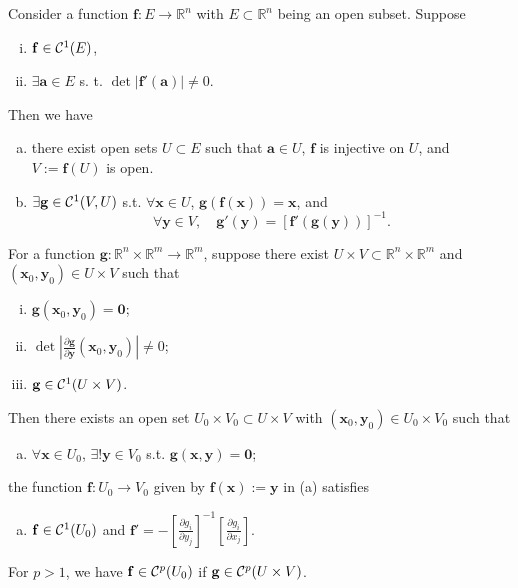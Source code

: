 \begin{thm}
  \label{thm:inverseFunc}
  Consider a function $\mathbf{f}: E\rightarrow \mathbb{R}^n$
  with $E\subset \mathbb{R}^n$ being an open subset.
  Suppose
  \begin{enumerate}[(i)]\itemsep0em
  \item $\mathbf{f}\in {\cal C}^1(E)$,
  \item $\exists\mathbf{a}\in E$ s. t.
    $\det|\mathbf{f}'(\mathbf{a})|\ne 0$.
  \end{enumerate}
  Then we have
  \begin{enumerate}[(a)]\itemsep0em
  \item there exist open sets $U\subset E$ such that
    $\mathbf{a}\in U$, %
    $\mathbf{f}$ is injective on $U$,
    and $V:=\mathbf{f}(U)$ is open.
  \item $\exists \mathbf{g}\in {\cal C}^1(V,U)$ s.t. 
    $\forall \mathbf{x}\in U$, $\mathbf{g}(\mathbf{f}(\mathbf{x}))=\mathbf{x}$, 
    and
    \begin{equation}
      \label{eq:inverseFuncDeriv}
      \forall \mathbf{y}\in V,\quad
      \mathbf{g}'(\mathbf{y}) = [\mathbf{f}'(\mathbf{g}(\mathbf{y}))]^{-1}.
    \end{equation}
  \end{enumerate}
\end{thm}

\begin{thm}
  \label{thm:implicitFunction}
  For a function $\mathbf{g}:
  \mathbb{R}^n\times \mathbb{R}^m\to \mathbb{R}^m$,
  suppose there exist
  $U\times V\subset \mathbb{R}^n\times \mathbb{R}^m$
  and $(\mathbf{x}_0, \mathbf{y}_0)\in U\times V$
  such that
  \begin{enumerate}[(i)]\itemsep0em
  \item $\mathbf{g}(\mathbf{x}_0, \mathbf{y}_0)=\mathbf{0}$; 
  \item $\det\left|\frac{\partial \mathbf{g}}{\partial
        \mathbf{y}}(\mathbf{x}_0, \mathbf{y}_0)\right|\ne 0$;
  \item $\mathbf{g}\in {\cal C}^1(U\times V)$.
  \end{enumerate}
  Then there exists an open set $U_0\times V_0\subset U\times V$
  with $(\mathbf{x}_0,\mathbf{y}_0)\in U_0\times V_0$ such that
  \begin{enumerate}[(a)]\itemsep0em
  \item $\forall \mathbf{x}\in U_0$, $\exists! \mathbf{y}\in V_0$ s.t.
    $\mathbf{g}(\mathbf{x}, \mathbf{y})=\mathbf{0}$; 
  \end{enumerate}
  the function $\mathbf{f}: U_0\to V_0$ given by
  $\mathbf{f}(\mathbf{x}) := \mathbf{y}$ in (a) satisfies
  \begin{enumerate}[(b)]\itemsep0em
  \item $\mathbf{f}\in{\cal C}^1(U_0)$ and
    $\mathbf{f}'=-[\frac{\partial g_i}{\partial y_j}]^{-1}
    [\frac{\partial g_i}{\partial x_j}]$.
  \end{enumerate}
  For $p>1$, we have $\mathbf{f}\in{\cal C}^p(U_0)$ if
  $\mathbf{g}\in {\cal C}^p(U\times V)$.
\end{thm}

